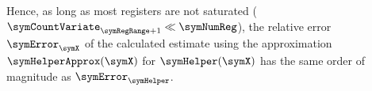 \documentclass[a4paper]{scrartcl}
\begin{document}
Hence, as long as most registers are not saturated ($\symCountVariate_{\symRegRange+1}\ll\symNumReg$), the relative error $\symError_\symX$ of the calculated estimate using the approximation $\symHelperApprox(\symX)$ for $\symHelper(\symX)$ has the same order of magnitude as $\symError_\symHelper$.



\end{document}
